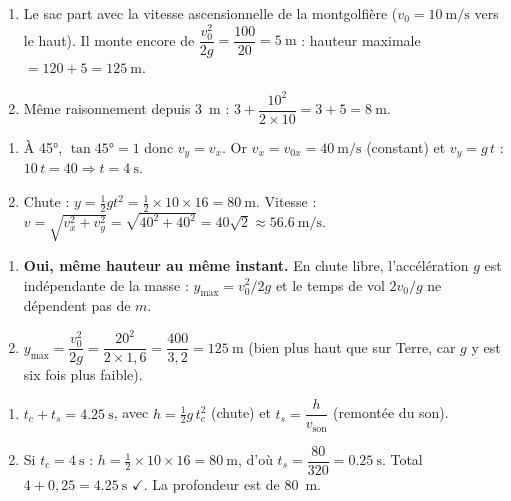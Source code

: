\documentclass[11pt,a4paper]{article}
\begin{document}

\begin{corrige}
\begin{enumerate}[label=\alph*)]
  \item Le sac part avec la vitesse ascensionnelle de la montgolfière ($v_0=\qty{10}{\metre\per\second}$ vers le haut). Il monte encore de $\dfrac{v_0^2}{2g}=\dfrac{100}{20}=\qty{5}{\metre}$ : hauteur maximale $=120+5=\qty{125}{\metre}$.
  \item Même raisonnement depuis \qty{3}{\metre} : $3+\dfrac{10^2}{2\times10}=3+5=\qty{8}{\metre}$.
\end{enumerate}
\end{corrige}

\begin{corrige}
\begin{enumerate}[label=\alph*)]
  \item À \ang{45}, $\tan\ang{45}=1$ donc $v_y=v_x$. Or $v_x=v_{0x}=\qty{40}{\metre\per\second}$ (constant) et $v_y=g\,t$ : $10\,t=40 \Rightarrow t=\qty{4}{\second}$.
  \item Chute : $y=\tfrac12 g t^2=\tfrac12\times10\times16=\qty{80}{\metre}$. Vitesse : $v=\sqrt{v_x^2+v_y^2}=\sqrt{40^2+40^2}=40\sqrt2\approx\qty{56,6}{\metre\per\second}$.
\end{enumerate}
\end{corrige}

\begin{corrige}
\begin{enumerate}[label=\alph*)]
  \item \textbf{Oui, même hauteur au même instant.} En chute libre, l'accélération $g$ est indépendante de la masse : $y_{\max}=v_0^2/2g$ et le temps de vol $2v_0/g$ ne dépendent pas de $m$.
  \item $y_{\max}=\dfrac{v_0^2}{2g}=\dfrac{20^2}{2\times1{,}6}=\dfrac{400}{3{,}2}=\qty{125}{\metre}$ (bien plus haut que sur Terre, car $g$ y est six fois plus faible).
\end{enumerate}
\end{corrige}

\begin{corrige}
\begin{enumerate}[label=\alph*)]
  \item $t_c+t_s=\qty{4,25}{\second}$, avec $h=\tfrac12 g\,t_c^2$ (chute) et $t_s=\dfrac{h}{v_{\text{son}}}$ (remontée du son).
  \item Si $t_c=\qty{4}{\second}$ : $h=\tfrac12\times10\times16=\qty{80}{\metre}$, d'où $t_s=\dfrac{80}{320}=\qty{0,25}{\second}$. Total $4+0{,}25=\qty{4,25}{\second}$ $\checkmark$. La profondeur est de \qty{80}{\metre}.
\end{enumerate}
\end{corrige}
\end{document}
